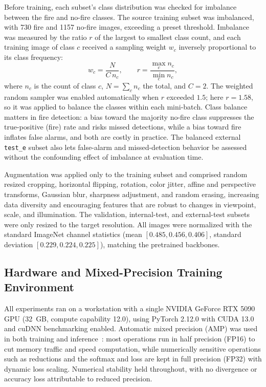 \documentclass[conference]{IEEEtran}
\begin{document}
Before training, each subset's class distribution was checked for imbalance between the fire and no-fire classes. The source training subset was imbalanced, with 730 fire and 1157 no-fire images, exceeding a preset threshold. Imbalance was measured by the ratio $r$ of the largest to smallest class count, and each training image of class $c$ received a sampling weight $w_c$ inversely proportional to its class frequency:
\begin{equation}
w_c = \frac{N}{C\, n_c},
\qquad
r = \frac{\max_c n_c}{\min_c n_c},
\label{eq:classweight}
\end{equation}
where $n_c$ is the count of class $c$, $N = \sum_c n_c$ the total, and $C = 2$. The weighted random sampler was enabled automatically when $r$ exceeded $1.5$; here $r = 1.58$, so it was applied to balance the classes within each mini-batch. Class balance matters in fire detection: a bias toward the majority no-fire class suppresses the true-positive (fire) rate and risks missed detections, while a bias toward fire inflates false alarms, and both are costly in practice. The balanced external \texttt{test\_e} subset also lets false-alarm and missed-detection behavior be assessed without the confounding effect of imbalance at evaluation time.

Augmentation was applied only to the training subset and comprised random resized cropping, horizontal flipping, rotation, color jitter, affine and perspective transforms, Gaussian blur, sharpness adjustment, and random erasing, increasing data diversity and encouraging features that are robust to changes in viewpoint, scale, and illumination. The validation, internal-test, and external-test subsets were only resized to the target resolution. All images were normalized with the standard ImageNet channel statistics (mean $[0.485, 0.456, 0.406]$, standard deviation $[0.229, 0.224, 0.225]$), matching the pretrained backbones.

\subsection{Hardware and Mixed-Precision Training Environment}

All experiments ran on a workstation with a single NVIDIA GeForce RTX 5090 GPU (32~GB, compute capability 12.0), using PyTorch 2.12.0 with CUDA 13.0 and cuDNN benchmarking enabled. Automatic mixed precision (AMP) was used in both training and inference~\cite{micikevicius2018mixed}: most operations run in half precision (FP16) to cut memory traffic and speed computation, while numerically sensitive operations such as reductions and the softmax and loss are kept in full precision (FP32) with dynamic loss scaling. Numerical stability held throughout, with no divergence or accuracy loss attributable to reduced precision.
\end{document}
